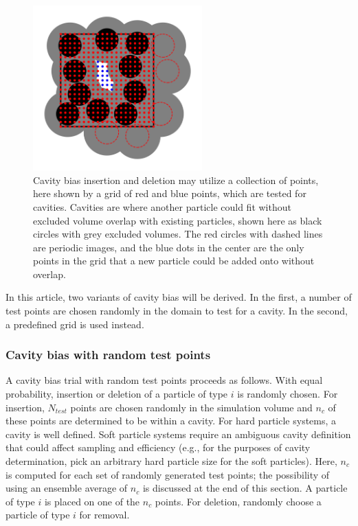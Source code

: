 \documentclass[
  9pt,
  bestpractices,
]{livecoms}
\begin{document}
\begin{figure}
\begin{centering}
\includegraphics[width=6.5cm]{../figures/cavity.png}
\caption{
Cavity bias insertion and deletion may utilize a collection of points, here shown by a grid of red and blue points, which are tested for cavities.
Cavities are where another particle could fit without excluded volume overlap with existing particles, shown here as black circles with grey excluded volumes.
The red circles with dashed lines are periodic images, and the blue dots in the center are the only points in the grid that a new particle could be added onto without overlap.
}
\label{fig:cavity}
\end{centering}
\end{figure}

In this article, two variants of cavity bias will be derived.
In the first, a number of test points are chosen randomly in the domain to test for a cavity.
In the second, a predefined grid is used instead.

\subsubsection{\label{sec:lhs_insdel_cavity_random}Cavity bias with random test points}

A cavity bias trial with random test points proceeds as follows.
With equal probability, insertion or deletion of a particle of type $i$ is randomly chosen.
For insertion, $N_{test}$ points are chosen randomly in the simulation volume and $n_c$ of these points are determined to be within a cavity.
For hard particle systems, a cavity is well defined.
Soft particle systems require an ambiguous cavity definition that could affect sampling and efficiency (e.g., for the purposes of cavity determination, pick an arbitrary hard particle size for the soft particles).
Here, $n_c$ is computed for each set of randomly generated test points; the possibility of using an ensemble average of $n_c$ is discussed at the end of this section.
A particle of type $i$ is placed on one of the $n_c$ points.
For deletion, randomly choose a particle of type $i$ for removal.
\end{document}
